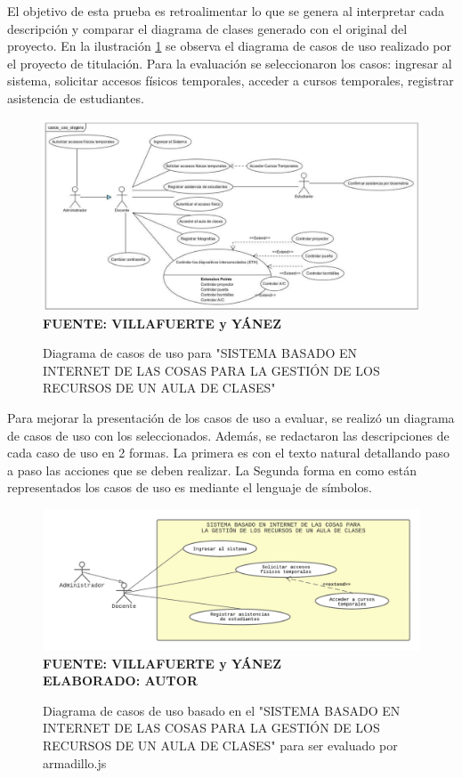 El objetivo de esta prueba es retroalimentar lo que se genera al interpretar cada descripción y comparar el diagrama de clases generado con el original del proyecto. En la ilustración \ref{fig:dcu_aula_inteligente} se observa el diagrama de casos de uso realizado por el proyecto de titulación. Para la evaluación se seleccionaron los casos: ingresar al sistema, solicitar accesos físicos temporales, acceder a cursos temporales, registrar asistencia de estudiantes.

\begin{figure}[h!]
	\centering
	\caption{Diagrama de casos de uso para "SISTEMA BASADO EN INTERNET DE LAS COSAS PARA LA GESTIÓN DE LOS RECURSOS DE UN AULA DE CLASES"}
	\includegraphics[width=13cm]{img/dgcu-aula-int.png}
	\label{fig:dcu_aula_inteligente}
	\vspace{4mm}
	{\footnotesize \textbf{\\ FUENTE:  VILLAFUERTE y YÁNEZ \cite{Villafuerte2020}}}
\end{figure}

Para mejorar la presentación de los casos de uso a evaluar, se realizó un diagrama de casos de uso con los seleccionados. Además, se redactaron las descripciones de cada caso de uso en 2 formas. La primera es con el texto natural detallando paso a paso las acciones que se deben realizar. La Segunda forma en como están representados los casos de uso es mediante el lenguaje de símbolos.

\begin{figure}[h!]
	\centering
	\caption{Diagrama de casos de uso basado en el "SISTEMA BASADO EN INTERNET DE LAS COSAS PARA LA GESTIÓN DE LOS RECURSOS DE UN AULA DE CLASES" para ser evaluado por armadillo.js}
	\includegraphics[width=15cm]{img/dcu_eva_ai.png}
	\label{fig:dcu_eva_aula_inteligente}
	\vspace{4mm}
	{\footnotesize \textbf{\\ FUENTE: VILLAFUERTE y YÁNEZ \cite{Villafuerte2020}} \textbf{\\ ELABORADO: AUTOR}}
\end{figure}

